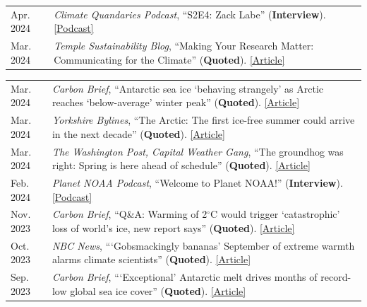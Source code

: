 \documentclass[margin,line,palatino,courier,10pt]{res}
\begin{document}
\begin{resume}
\begin{tabular}{@{}p{0.9in}p{4in}}
Apr. 2024 & \textit{Climate Quandaries Podcast}, ``S2E4: Zack Labe'' (\textbf{Interview}). \href{https://open.spotify.com/episode/6RoWS9wThvWm2qc48f0rhj?si=0qvnBFuhSyKkts0oeR4CKA}{[Podcast]}\\
Mar. 2024 & \textit{Temple Sustainability Blog}, ``Making Your Research Matter: Communicating for the Climate'' (\textbf{Quoted}). \href{https://sites.temple.edu/tusustainability/2024/03/27/making-your-research-matter-communicating-for-the-climate/}{[Article]}\\
\end{tabular}
\begin{tabular}{@{}p{0.9in}p{4in}}
Mar. 2024 & \textit{Carbon Brief}, ``Antarctic sea ice `behaving strangely' as Arctic reaches `below-average' winter peak'' (\textbf{Quoted}). \href{https://www.carbonbrief.org/antarctic-sea-ice-behaving-strangely-as-arctic-reaches-below-average-winter-peak/}{[Article]}\\
Mar. 2024 & \textit{Yorkshire Bylines}, ``The Arctic: The first ice-free summer could arrive in the next decade'' (\textbf{Quoted}). \href{https://yorkshirebylines.co.uk/news/environment/the-arctic-the-first-ice-free-summer-could-arrive-in-the-next-decade/}{[Article]}\\
Mar. 2024 & \textit{The Washington Post, Capital Weather Gang}, ``The groundhog was right: Spring is here ahead of schedule'' (\textbf{Quoted}). \href{https://www.washingtonpost.com/weather/2024/03/02/spring-arriving-early-united-states/}{[Article]}\\
Feb. 2024 & \textit{Planet NOAA Podcast}, ``Welcome to Planet NOAA!'' (\textbf{Interview}). \href{https://www.noaa.gov/podcasts/planet-noaa-from-sun-to-sea-and-everything-in-between/welcome-to-planet-noaa}{[Podcast]}\\
Nov. 2023 & \textit{Carbon Brief}, ``Q\&A: Warming of 2$^{\circ}$C would trigger `catastrophic' loss of world’s ice, new report says'' (\textbf{Quoted}). \href{https://www.carbonbrief.org/qa-warming-of-2c-would-trigger-catastrophic-loss-of-worlds-ice-new-report-says/}{[Article]}\\
Oct. 2023 & \textit{NBC News}, ```Gobsmackingly bananas' September of extreme warmth alarms climate scientists'' (\textbf{Quoted}). \href{https://www.nbcnews.com/science/science-news/heat-september-extreme-warmth-climate-rcna118401}{[Article]}\\
Sep. 2023 & \textit{Carbon Brief}, ```Exceptional' Antarctic melt drives months of record-low global sea ice cover'' (\textbf{Quoted}). \href{https://www.carbonbrief.org/exceptional-antarctic-melt-drives-months-of-record-low-global-sea-ice-cover/}{[Article]}\\

\end{tabular}
\end{resume}
\end{document}
